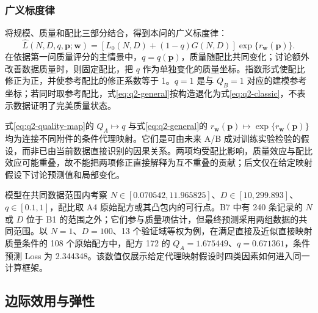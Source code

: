 \subsubsection{广义标度律}

将规模、质量和配比三部分结合，得到本问的广义标度律：
\begin{equation}
 \boxed{\widehat L(N,D,q,\boldsymbol p;\boldsymbol w)
 =\left[L_0(N,D)+(1-q)G(N,D)\right]
       \exp\!\bigl\{r_{\boldsymbol w}(\boldsymbol p)\bigr\}.}
 \label{eq:q2-general}
\end{equation}
在依据第一问质量评分的主情景中，$q=q(\boldsymbol p)$，质量随配比共同变化；讨论额外改善数据质量时，则固定配比，把 $q$ 作为单独变化的质量坐标。指数形式使配比修正为正，并使参考配比的修正系数等于 1。$q=1$ 是与 $Q_B=1$ 对应的建模参考坐标；若同时取参考配比，式\eqref{eq:q2-general}按构造退化为式\eqref{eq:q2-classic}，不表示数据证明了完美质量状态。

式\eqref{eq:q2-quality-map}的 $Q_A\mapsto q$ 与式\eqref{eq:q2-general}的 $r_{\boldsymbol w}(\boldsymbol p)\mapsto\exp\{r_{\boldsymbol w}(\boldsymbol p)\}$ 均为连接不同附件的条件代理映射。它们是可由未来 A/B 成对训练实验检验的假设，而非已由当前数据直接识别的因果关系。两项均受配比影响，质量效应与配比效应可能重叠，故不能把两项修正直接解释为互不重叠的贡献；后文仅在给定映射假设下讨论预测值和局部变化。

模型在共同数据范围内考察 $N\in[0.070542,11.965825]$、$D\in[10,299.893]$、$q\in[0.1,1]$，配比取 A4 原始配方或其凸包内的可行点。B7 中有 240 条记录的 $N$ 或 $D$ 位于 B1 的范围之外；它们参与质量项估计，但最终预测采用两组数据的共同范围。以 $N=1$、$D=100$、13 个验证域等权为例，在满足直接及近似直接映射质量条件的 108 个原始配方中，配方 172 的 $Q_A=1.675449$、$q=0.671361$，条件预测 Loss 为 2.344348。该数值仅展示给定代理映射假设时四类因素如何进入同一计算框架。

\subsection{边际效用与弹性}

